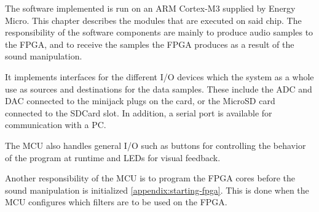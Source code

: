 The software implemented is run on an ARM Cortex-M3 supplied by Energy Micro.
This chapter describes the modules that are executed on said chip. The
responsibility of the software components are mainly to produce audio samples to
the FPGA, and to receive the samples the FPGA produces as a result of the sound
manipulation.

It implements interfaces for the different I/O devices which the system as a
whole use as sources and destinations for the data samples. These include the
ADC and DAC connected to the minijack plugs on the card, or the MicroSD card
connected to the SDCard slot. In addition, a serial port is available for
communication with a PC.

The MCU also handles general I/O such as buttons for controlling the behavior
of the program at runtime and LEDs for visual feedback.

Another responsibility  of the MCU is to program the FPGA cores before the sound
manipulation is initialized \ref{appendix:starting-fpga}. This is done when the
MCU configures which filters are to be used on the FPGA. 
